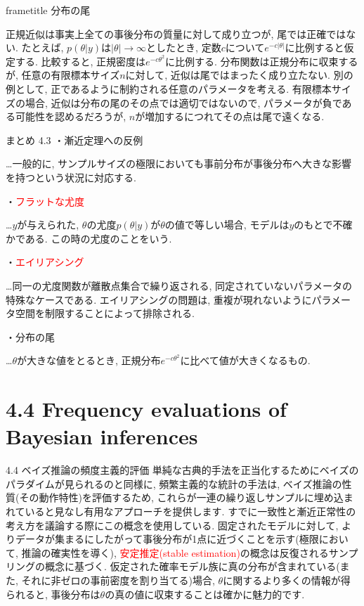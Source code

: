 \documentclass[10pt,dvipdfmx,a4]{beamer}
\newcommand{\dbox}[1]{\begin{beamercolorbox}[wd=122mm, sep=0pt, shadow=false, rounded=false]{frametitle} { #1}\end{beamercolorbox}}
\newcommand{\tcr}[1]{\textcolor{red}{#1}}
\begin{document}

\begin{frame}
\dbox{分布の尾}
正規近似は事実上全ての事後分布の質量に対して成り立つが, 尾では正確ではない.
たとえば, $p(\theta|y)$は$|\theta|\rightarrow \infty$としたとき, 定数$c$について$e^{-c|\theta|}$に比例すると仮定する.
比較すると, 正規密度は$e^{-c\theta^2}$に比例する.
分布関数は正規分布に収束するが, 任意の有限標本サイズ$n$に対して, 近似は尾ではまったく成り立たない.
別の例として, 正であるように制約される任意のパラメータを考える.
有限標本サイズの場合, 近似は分布の尾のその点では適切ではないので, パラメータが負である可能性を認めるだろうが, $n$が増加するにつれてその点は尾で遠くなる.
\end{frame}


\begin{frame}{まとめ 4.3}
・漸近定理への反例

…一般的に, サンプルサイズの極限においても事前分布が事後分布へ大きな影響を持つという状況に対応する.

・\tcr{フラットな尤度}

…$y$が与えられた, $\theta$の尤度$p(\theta|y)$が$\theta$の値で等しい場合, モデルは$y$のもとで不確かである.
この時の尤度のことをいう.

・\tcr{エイリアシング}

…同一の尤度関数が離散点集合で繰り返される, 同定されていないパラメータの特殊なケースである.
エイリアシングの問題は, 重複が現れないようにパラメータ空間を制限することによって排除される.

・分布の尾

…$\theta$が大きな値をとるとき, 正規分布$e^{-c\theta^2}$に比べて値が大きくなるもの.
\end{frame}


\section{4.4 Frequency evaluations of Bayesian inferences}
\begin{frame}{4.4 ベイズ推論の頻度主義的評価}
単純な古典的手法を正当化するためにベイズのパラダイムが見られるのと同様に, 頻繁主義的な統計の手法は, ベイズ推論の性質(その動作特性)を評価するため, これらが一連の繰り返しサンプルに埋め込まれていると見なし有用なアプローチを提供します.
すでに一致性と漸近正常性の考え方を議論する際にこの概念を使用している.
固定されたモデルに対して, よりデータが集まるにしたがって事後分布が1点に近づくことを示す(極限において, 推論の確実性を導く), \tcr{安定推定(stable estimation)}の概念は反復されるサンプリングの概念に基づく.
仮定された確率モデル族に真の分布が含まれている(また, それに非ゼロの事前密度を割り当てる)場合, $\theta$に関するより多くの情報が得られると, 事後分布は$\theta$の真の値に収束することは確かに魅力的です.
\end{frame}
\end{document}
